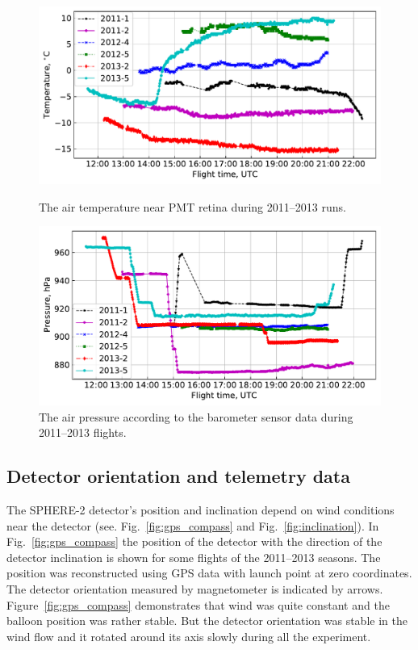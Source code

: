 \documentclass[final,5p,times,twocolumn]{elsarticle}
\begin{document}
\begin{figure}[tb]
    \begin{minipage}[t]{0.48\textwidth}
    \centering
    \includegraphics[width=\textwidth]{Telemetry_tmos.pdf}
    \caption{The air temperature near PMT retina during 2011--2013 runs.}
    \label{fig:temperature}
    \end{minipage}
    \hfill
    \begin{minipage}[t]{0.48\textwidth}
    \centering
    \includegraphics[width=\textwidth]{Telemetry_pressure.pdf}
    \caption{The air pressure according to the barometer sensor data  during 2011--2013 flights.}
    \label{fig:pressure}
    \end{minipage}
\end{figure}


\subsection{Detector orientation and telemetry data}
\label{sect:telemetrydata}

The \mbox{SPHERE-2} detector's position and inclination depend on wind conditions near the detector (see. Fig.~\ref{fig:gps_compass} and Fig.~\ref{fig:inclination}). In Fig.~\ref{fig:gps_compass} the position of the detector with the direction of the detector inclination is shown for some flights of the 2011--2013 seasons. The position was reconstructed using GPS data with launch point at zero coordinates. The detector orientation measured by magnetometer is indicated by arrows. Figure~\ref{fig:gps_compass} demonstrates that wind was quite constant and the balloon position was rather stable. But the detector orientation was stable in the wind flow and it rotated around its axis slowly during all the experiment.  
\end{document}
